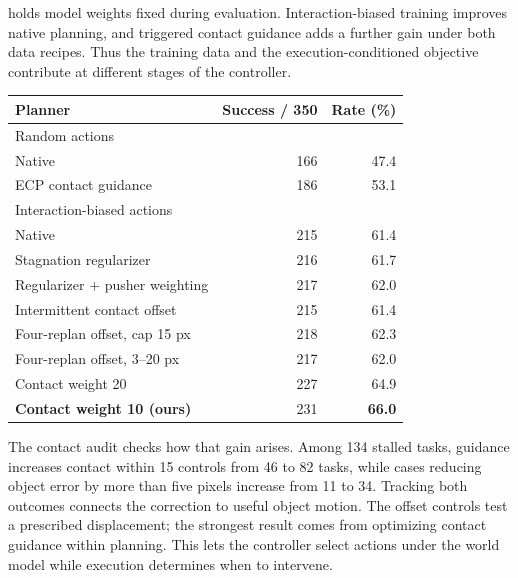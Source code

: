 \begin{table}[!t]
\begin{minipage}[t]{\columnwidth}
 holds model weights fixed during evaluation. Interaction-biased training improves native planning, and triggered contact guidance adds a further gain under both data recipes. Thus the training data and the execution-conditioned objective contribute at different stages of the controller.\par
\end{minipage}\hfill
\begin{minipage}[t]{\columnwidth}
\vspace{0pt}
\par\smallskip
{\centering
\centering
{}
\label{tab:lewm-contact}
\small
\begin{tabular}{lrr}
\toprule
Planner & Success / 350 & Rate (\%)\\
\midrule
\multicolumn{3}{l}{Random actions}\\
Native &166&47.4\\
ECP contact guidance &186&53.1\\
\midrule
\multicolumn{3}{l}{Interaction-biased actions}\\
Native &215&61.4\\
Stagnation regularizer &216&61.7\\
Regularizer + pusher weighting &217&62.0\\
Intermittent contact offset &215&61.4\\
Four-replan offset, cap 15 px &218&62.3\\
Four-replan offset, 3--20 px &217&62.0\\
Contact weight 20 &227&64.9\\
\textbf{Contact weight 10 (ours)} &231&\textbf{66.0}\\
\bottomrule
\end{tabular}
\par}
\par\smallskip
\normalsize
The contact audit checks how that gain arises. Among 134 stalled tasks, guidance increases contact within 15 controls from 46 to 82 tasks, while cases reducing object error by more than five pixels increase from 11 to 34. Tracking both outcomes connects the correction to useful object motion. The offset controls test a prescribed displacement; the strongest result comes from optimizing contact guidance within planning. This lets the controller select actions under the world model while execution determines when to intervene.\par
\end{minipage}\par
\par\smallskip
\noindent \begin{minipage}[t]{\columnwidth}
\vspace{0pt}

\end{minipage}
\end{table}
